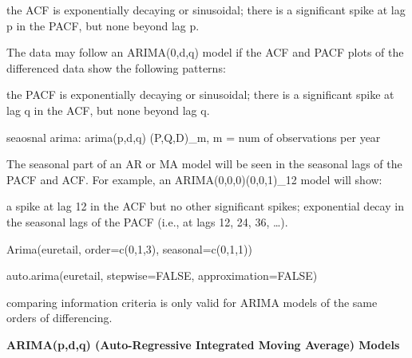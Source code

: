 \documentclass[]{book}
\begin{document}
the ACF is exponentially decaying or sinusoidal; there is a significant spike at lag
p in the PACF, but none beyond lag p.

The data may follow an ARIMA(0,d,q) model if the ACF and PACF plots of the differenced data show the following patterns:

the PACF is exponentially decaying or sinusoidal; there is a significant spike at lag
q in the ACF, but none beyond lag q.

seaosnal arima: arima(p,d,q) (P,Q,D)\_m, m = num of observations per year

The seasonal part of an AR or MA model will be seen in the seasonal lags of the PACF and ACF. For example, an ARIMA(0,0,0)(0,0,1)\_12 model will show:

a spike at lag 12 in the ACF but no other significant spikes; exponential decay in the seasonal lags of the PACF (i.e., at lags 12, 24, 36, \ldots{}).

Arima(euretail, order=c(0,1,3), seasonal=c(0,1,1))

auto.arima(euretail, stepwise=FALSE, approximation=FALSE)

comparing information criteria is only valid for ARIMA models of the same orders of differencing.

\textbf{ARIMA(p,d,q) (Auto-Regressive Integrated Moving Average) Models}
\end{document}
